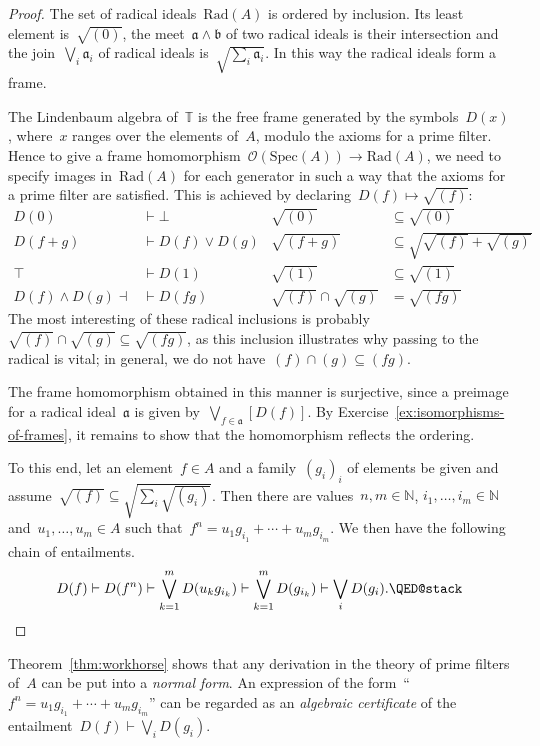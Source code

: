 \documentclass{ws-rv9x6}
\renewcommand{\O}{\mathcal{O}}
\newcommand{\NN}{\mathbb{N}}
\newcommand{\TT}{\mathbb{T}}
\newcommand{\aaa}{\mathfrak{a}}
\newcommand{\bbb}{\mathfrak{b}}
\newcommand{\Spec}{\mathrm{Spec}}
\newcommand{\Rad}{\mathrm{Rad}}
\renewcommand{\_}{\mathpunct{.}}
\newcommand{\?}{\,{:}\,}
\begin{document}
\begin{proof}The set of radical ideals~$\Rad(A)$ is ordered by inclusion. Its
least element is~$\sqrt{(0)}$, the meet~$\aaa \wedge \bbb$ of two radical
ideals is their intersection and the join~$\bigvee_i \aaa_i$ of radical ideals
is~$\sqrt{\sum_i \aaa_i}$. In this way the radical ideals form a frame.

The Lindenbaum algebra of~$\TT$ is the free frame generated by the symbols~$D(x)$,
where~$x$ ranges over the elements of~$A$, modulo the axioms for a prime
filter. Hence to give a frame homomorphism~$\O(\Spec(A)) \to \Rad(A)$, we need
to specify images in~$\Rad(A)$ for each generator in such a way that the
axioms for a prime filter are satisfied. This is achieved by declaring~$D(f)
\mapsto \sqrt{(f)}$:
\begin{align*}
  D(0) &\vdash \bot & \sqrt{(0)} &\subseteq \sqrt{(0)} \\
  D(f+g) &\vdash D(f) \vee D(g) & \sqrt{(f+g)} &\subseteq\textstyle \sqrt{\sqrt{(f)} + \sqrt{(g)}} \\
  \top &\vdash D(1) & \sqrt{(1)} &\subseteq \sqrt{(1)} \\
  D(f) \wedge D(g) \dashv\!&\vdash D(fg) & \sqrt{(f)} \cap \sqrt{(g)} &= \sqrt{(fg)}
\end{align*}
The most interesting of these radical inclusions is probably~$\sqrt{(f)} \cap
\sqrt{(g)} \subseteq \sqrt{(fg)}$, as this inclusion illustrates why passing to the
radical is vital; in general, we do not have~$(f) \cap (g) \subseteq (fg)$.

The frame homomorphism obtained in this manner is surjective, since a preimage
for a radical ideal~$\aaa$ is given by~$\bigvee_{f \in \aaa} [D(f)]$. By
Exercise~\ref{ex:isomorphisms-of-frames}, it
remains to show that the homomorphism reflects the ordering.

To this end, let an element~$f \in A$ and a family~$(g_i)_i$ of elements be
given and assume~$\sqrt{(f)} \subseteq \sqrt{\sum_i \sqrt{(g_i)}}$. Then there
are values~$n,m \in \NN$, $i_1,\ldots,i_m \in \NN$ and~$u_1,\ldots,u_m \in
A$ such that~$f^n = u_1 g_{i_1} + \cdots + u_m g_{i_m}$. We then have the
following chain of entailments.
\[
  D(f) \vdash
  D(f^n) \vdash
  \bigvee_{k=1}^m D(u_k g_{i_k}) \vdash
  \bigvee_{k=1}^m D(g_{i_k}) \vdash
  \bigvee_i D(g_i). \qedhere
\]
\end{proof}

Theorem~\ref{thm:workhorse} shows that any derivation in the theory of prime
filters of~$A$ can be put into a \emph{normal form}. An expression of the
form~``$f^n = u_1 g_{i_1} + \cdots + u_m g_{i_m}$'' can be regarded as an
\emph{algebraic certificate} of the entailment~$D(f) \vdash \bigvee_i D(g_i)$.
\end{document}
